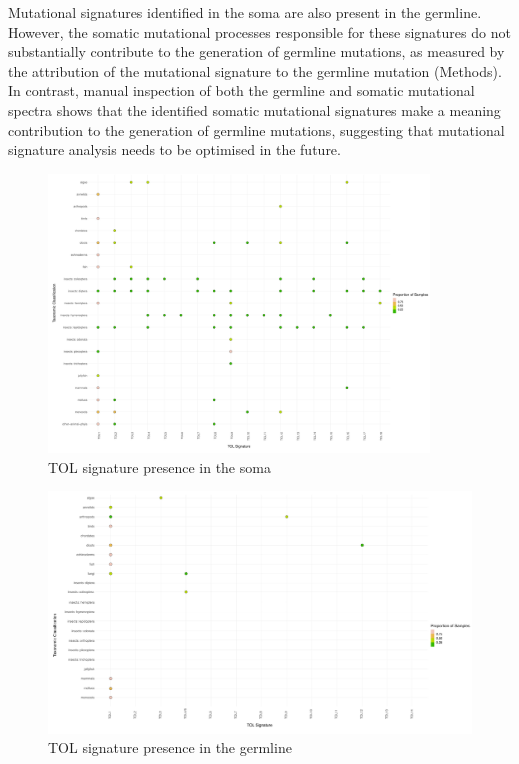 Mutational signatures identified in the soma are also present in the germline. However, the somatic mutational processes responsible for these signatures do not substantially contribute to the generation of germline mutations, as measured by the attribution of the mutational signature to the germline mutation (Methods). In contrast, manual inspection of both the germline and somatic mutational spectra shows that the identified somatic mutational signatures make a meaning contribution to the generation of germline mutations, suggesting that mutational signature analysis needs to be optimised in the future.

\begin{figure}[htbp!]
\caption{TOL signature presence in the soma}
\label{figure:tol-soma}
\begin{centering}
\includegraphics[width=0.9\textwidth]{Vector/dtol_all_edited_tol_signature_presence_in_somatic.pdf}
\end{centering}
\end{figure}

\begin{figure}[htbp!]
\caption{TOL signature presence in the germline}
\label{figure:tol-germline}
\begin{centering}
\includegraphics[width=\textwidth]{Vector/dtol_all_edited_tol_signature_presence_in_germline.pdf}
\end{centering}
\end{figure}

